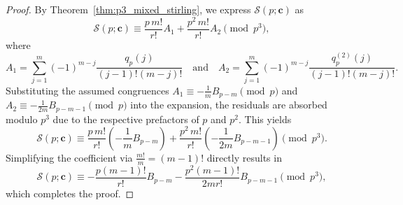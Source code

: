 \documentclass[12pt]{amsart}
\theoremstyle{definition}
\begin{document}
\begin{proof}
By Theorem~\ref{thm:p3_mixed_stirling}, we express $\mathcal{S}(p; \mathbf{c})$ as
\[
\mathcal{S}(p; \mathbf{c})
\equiv
\frac{p \, m!}{r!} A_1
+
\frac{p^2 \, m!}{r!} A_2
\pmod{p^3},
\]
where
\[
A_1 = \sum_{j=1}^{m} (-1)^{m-j} \frac{q_p(j)}{(j-1)!(m-j)!}
\quad \text{and} \quad
A_2 = \sum_{j=1}^{m} (-1)^{m-j} \frac{q_p^{(2)}(j)}{(j-1)!(m-j)!}.
\]
Substituting the assumed congruences $A_1 \equiv -\frac{1}{m} B_{p-m} \pmod p$ and $A_2 \equiv -\frac{1}{2m} B_{p-m-1} \pmod p$ into the expansion, the residuals are absorbed modulo $p^3$ due to the respective prefactors of $p$ and $p^2$. This yields
\[
\mathcal{S}(p; \mathbf{c})
\equiv
\frac{p \, m!}{r!} \left(-\frac{1}{m} B_{p-m}\right)
+
\frac{p^2 \, m!}{r!} \left(-\frac{1}{2m} B_{p-m-1}\right)
\pmod{p^3}.
\]
Simplifying the coefficient via $\frac{m!}{m} = (m-1)!$ directly results in
\[
\mathcal{S}(p; \mathbf{c})
\equiv
-\frac{p(m-1)!}{r!} B_{p-m}
-
\frac{p^2(m-1)!}{2mr!} B_{p-m-1}
\pmod{p^3},
\]
which completes the proof.
\end{proof}
\end{document}
